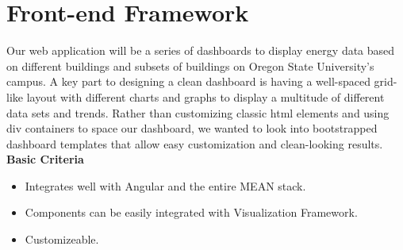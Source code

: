 \documentclass[onecolumn, draftclsnofoot,10pt, compsoc]{IEEEtran}
\begin{document}
\section{Front-end Framework}
Our web application will be a series of dashboards to display energy data based on different buildings and subsets of buildings on Oregon State University's campus. A key part to designing a clean dashboard is having a well-spaced grid-like layout with different charts and graphs to display a multitude of different data sets and trends. Rather than customizing classic html elements and using div containers to space our dashboard, we wanted to look into bootstrapped dashboard templates that allow easy customization and clean-looking results.\\ 
\textbf{Basic Criteria}
\begin{itemize}
\item Integrates well with Angular and the entire MEAN stack. 
\item Components can be easily integrated with Visualization Framework. 
\item Customizeable.
\end{itemize}
\end{document}
